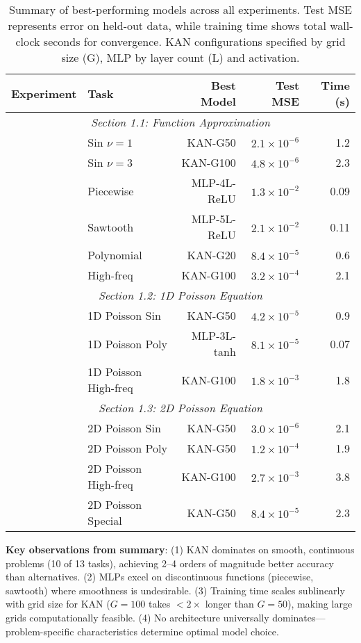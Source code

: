 \documentclass[11pt,a4paper]{article}
\begin{document}
\begin{table}[htbp]
\centering
\caption{Summary of best-performing models across all experiments. Test MSE represents error on held-out data, while training time shows total wall-clock seconds for convergence. KAN configurations specified by grid size (G), MLP by layer count (L) and activation.}
\label{tab:summary}
\begin{tabular}{llrrr}
\toprule
\textbf{Experiment} & \textbf{Task} & \textbf{Best Model} & \textbf{Test MSE} & \textbf{Time (s)} \\
\midrule
\multicolumn{5}{c}{\textit{Section 1.1: Function Approximation}} \\
\midrule
 & Sin $\nu=1$ & KAN-G50 & $2.1 \times 10^{-6}$ & 1.2 \\
 & Sin $\nu=3$ & KAN-G100 & $4.8 \times 10^{-6}$ & 2.3 \\
 & Piecewise & MLP-4L-ReLU & $1.3 \times 10^{-2}$ & 0.09 \\
 & Sawtooth & MLP-5L-ReLU & $2.1 \times 10^{-2}$ & 0.11 \\
 & Polynomial & KAN-G20 & $8.4 \times 10^{-5}$ & 0.6 \\
 & High-freq & KAN-G100 & $3.2 \times 10^{-4}$ & 2.1 \\
\midrule
\multicolumn{5}{c}{\textit{Section 1.2: 1D Poisson Equation}} \\
\midrule
 & 1D Poisson Sin & KAN-G50 & $4.2 \times 10^{-5}$ & 0.9 \\
 & 1D Poisson Poly & MLP-3L-tanh & $8.1 \times 10^{-5}$ & 0.07 \\
 & 1D Poisson High-freq & KAN-G100 & $1.8 \times 10^{-3}$ & 1.8 \\
\midrule
\multicolumn{5}{c}{\textit{Section 1.3: 2D Poisson Equation}} \\
\midrule
 & 2D Poisson Sin & KAN-G50 & $3.0 \times 10^{-6}$ & 2.1 \\
 & 2D Poisson Poly & KAN-G50 & $1.2 \times 10^{-4}$ & 1.9 \\
 & 2D Poisson High-freq & KAN-G100 & $2.7 \times 10^{-3}$ & 3.8 \\
 & 2D Poisson Special & KAN-G50 & $8.4 \times 10^{-5}$ & 2.3 \\
\bottomrule
\end{tabular}
\end{table}

\textbf{Key observations from summary}: (1) KAN dominates on smooth, continuous problems (10 of 13 tasks), achieving 2--4 orders of magnitude better accuracy than alternatives. (2) MLPs excel on discontinuous functions (piecewise, sawtooth) where smoothness is undesirable. (3) Training time scales sublinearly with grid size for KAN ($G=100$ takes $<2\times$ longer than $G=50$), making large grids computationally feasible. (4) No architecture universally dominates—problem-specific characteristics determine optimal model choice.
\end{document}
